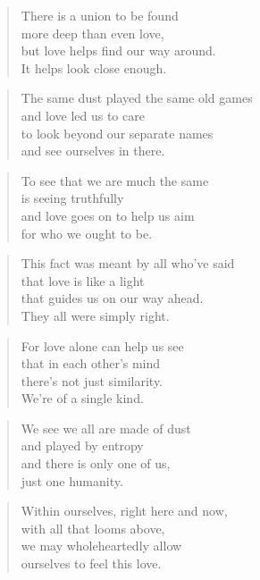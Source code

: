 \documentclass[14pt,a4paper]{article}
\begin{document}
\begin{verse}
There is a union to be found\\
more deep than even love,\\
but love helps find our way around.\\
It helps look close enough.
\end{verse}

\begin{verse}
The same dust played the same old games\\
and love led us to care\\
to look beyond our separate names\\
and see ourselves in there.
\end{verse}

\begin{verse}
To see that we are much the same\\
is seeing truthfully\\
and love goes on to help us aim\\
for who we ought to be.
\end{verse}

\begin{verse}
This fact was meant by all who’ve said\\
that love is like a light\\
that guides us on our way ahead.\\
They all were simply right.
\end{verse}

\begin{verse}
For love alone can help us see\\
that in each other’s mind\\
there’s not just similarity.\\
We’re of a single kind.
\end{verse}

\begin{verse}
We see we all are made of dust\\
and played by entropy\\
and there is only one of us,\\
just one humanity.
\end{verse}

\begin{verse}
Within ourselves, right here and now,\\
with all that looms above,\\
we may wholeheartedly allow\\
ourselves to feel this love.
\end{verse}
\end{document}
